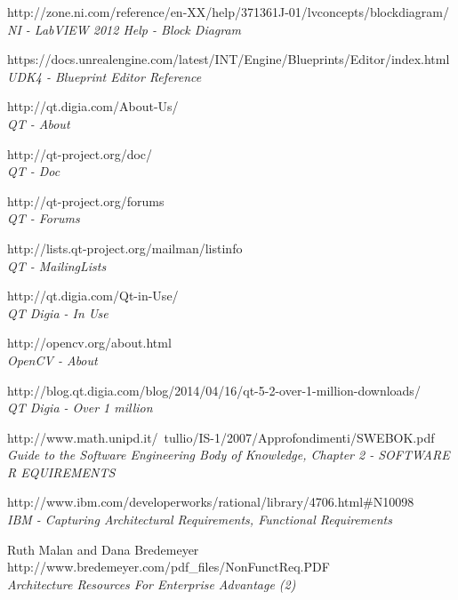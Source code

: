 \documentclass[a4paper,12pt,oneside]{report}
\begin{document}
\begin{thebibliography}{99}
		http://zone.ni.com/reference/en-XX/help/371361J-01/lvconcepts/blockdiagram/\\
        {\em NI - LabVIEW 2012 Help - Block Diagram}  

		https://docs.unrealengine.com/latest/INT/Engine/Blueprints/Editor/index.html\\
        {\em UDK4 - Blueprint Editor Reference}  


		http://qt.digia.com/About-Us/\\
        {\em QT - About } 
 
        http://qt-project.org/doc/\\
        {\em QT - Doc} 
         
        http://qt-project.org/forums\\
        {\em QT - Forums}        

          http://lists.qt-project.org/mailman/listinfo \\
        {\em QT - MailingLists}        


        http://qt.digia.com/Qt-in-Use/\\
        {\em QT Digia - In Use}  
        
        
        http://opencv.org/about.html\\
        {\em OpenCV - About}  
        
        
		http://blog.qt.digia.com/blog/2014/04/16/qt-5-2-over-1-million-downloads/\\
        {\em QT Digia - Over 1 million}  
        
        http://www.math.unipd.it/~tullio/IS-1/2007/Approfondimenti/SWEBOK.pdf\\
        {\em Guide to the Software Engineering Body of Knowledge, Chapter 2 - SOFTWARE R EQUIREMENTS}
        
        
		http://www.ibm.com/developerworks/rational/library/4706.html\#N10098 \\
        {\em IBM - Capturing Architectural Requirements, Functional Requirements }
        
		Ruth Malan and Dana Bredemeyer
		http://www.bredemeyer.com/pdf\_files/NonFunctReq.PDF \\
        {\em Architecture Resources For Enterprise Advantage (2)\\}
        


\end{thebibliography}
\end{document}

